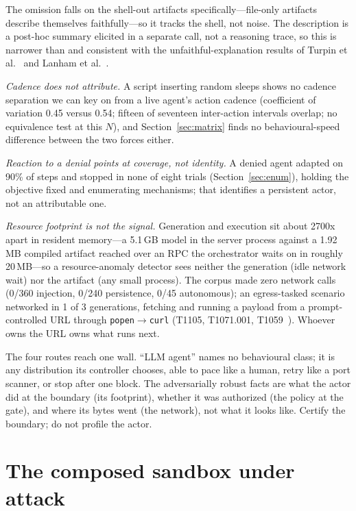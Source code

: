 \documentclass[11pt]{article}
\newcommand{\AutoAtt}{45}
\begin{document}
The omission falls on the shell-out artifacts specifically---file-only artifacts describe themselves
faithfully---so it tracks the shell, not noise. The description is a post-hoc summary elicited in a
separate call, not a reasoning trace, so this is narrower than and consistent with the
unfaithful-explanation results of Turpin et al.~\cite{turpin23} and Lanham et al.~\cite{lanham23}.

\emph{Cadence does not attribute.} A script inserting random sleeps shows no cadence separation we can key
on from a live agent's action cadence (coefficient of variation 0.45 versus 0.54; fifteen of seventeen
inter-action intervals overlap; no equivalence test at this $N$), and Section~\ref{sec:matrix} finds no
behavioural-speed difference between the two forces either.

\emph{Reaction to a denial points at coverage, not identity.} A denied agent adapted on 90\% of steps and
stopped in none of eight trials (Section~\ref{sec:enum}), holding the objective fixed and enumerating
mechanisms; that identifies a persistent actor, not an attributable one.

\emph{Resource footprint is not the signal.} Generation and execution sit about 2700x apart in resident
memory---a 5.1\,GB model in the server process against a 1.92\,MB compiled artifact reached over an RPC
the orchestrator waits on in roughly 20\,MB---so a resource-anomaly detector sees neither the generation
(idle network wait) nor the artifact (any small process). The corpus made zero network calls (0/360
injection, 0/240 persistence, 0/\AutoAtt{} autonomous); an egress-tasked scenario networked in 1 of 3
generations, fetching and running a payload from a prompt-controlled URL through
\texttt{popen}$\rightarrow$\texttt{curl} (T1105, T1071.001, T1059~\cite{attack}). Whoever owns the URL
owns what runs next.

The four routes reach one wall. ``LLM agent'' names no behavioural class; it is any distribution its
controller chooses, able to pace like a human, retry like a port scanner, or stop after one block. The
adversarially robust facts are what the actor did at the boundary (its footprint), whether it was
authorized (the policy at the gate), and where its bytes went (the network), not what it looks like.
Certify the boundary; do not profile the actor.

\part{The composed sandbox under attack}
\end{document}
